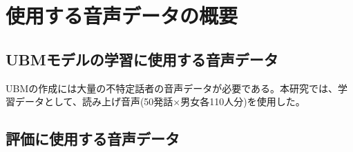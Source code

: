 \chapter{使用する音声データの概要}
\section{UBMモデルの学習に使用する音声データ}
UBMの作成には大量の不特定話者の音声データが必要である。本研究では、学習データとして、読み上げ音声\cite{ATR}(50発話×男女各110人分)を使用した。
\section{評価に使用する音声データ}
